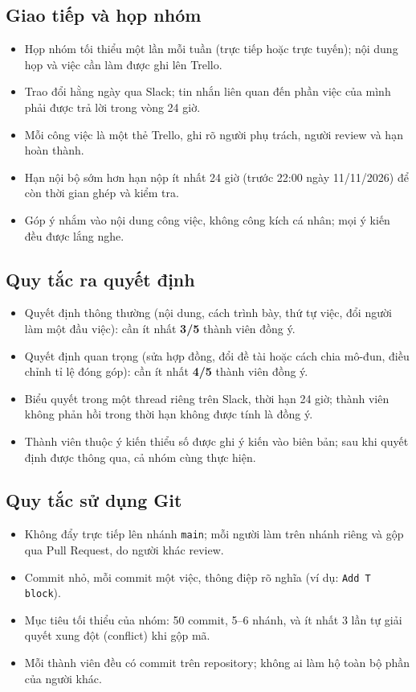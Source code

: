 \documentclass[13pt,a4paper]{extarticle}
\begin{document}
\subsection{Giao tiếp và họp nhóm}
\begin{itemize}
  \item Họp nhóm tối thiểu một lần mỗi tuần (trực tiếp hoặc trực tuyến); nội dung họp và việc cần làm được ghi lên Trello.
  \item Trao đổi hằng ngày qua Slack; tin nhắn liên quan đến phần việc của mình phải được trả lời trong vòng 24 giờ.
  \item Mỗi công việc là một thẻ Trello, ghi rõ người phụ trách, người review và hạn hoàn thành.
  \item Hạn nội bộ sớm hơn hạn nộp ít nhất 24 giờ (trước 22:00 ngày 11/11/2026) để còn thời gian ghép và kiểm tra.
  \item Góp ý nhắm vào nội dung công việc, không công kích cá nhân; mọi ý kiến đều được lắng nghe.
\end{itemize}

\subsection{Quy tắc ra quyết định}
\begin{itemize}
  \item Quyết định thông thường (nội dung, cách trình bày, thứ tự việc, đổi người làm một đầu việc): cần ít nhất \textbf{3/5} thành viên đồng ý.
  \item Quyết định quan trọng (sửa hợp đồng, đổi đề tài hoặc cách chia mô-đun, điều chỉnh tỉ lệ đóng góp): cần ít nhất \textbf{4/5} thành viên đồng ý.
  \item Biểu quyết trong một thread riêng trên Slack, thời hạn 24 giờ; thành viên không phản hồi trong thời hạn không được tính là đồng ý.
  \item Thành viên thuộc ý kiến thiểu số được ghi ý kiến vào biên bản; sau khi quyết định được thông qua, cả nhóm cùng thực hiện.
\end{itemize}

\subsection{Quy tắc sử dụng Git}
\begin{itemize}
  \item Không đẩy trực tiếp lên nhánh \texttt{main}; mỗi người làm trên nhánh riêng và gộp qua Pull Request, do người khác review.
  \item Commit nhỏ, mỗi commit một việc, thông điệp rõ nghĩa (ví dụ: \texttt{Add T block}).
  \item Mục tiêu tối thiểu của nhóm: 50 commit, 5--6 nhánh, và ít nhất 3 lần tự giải quyết xung đột (conflict) khi gộp mã.
  \item Mỗi thành viên đều có commit trên repository; không ai làm hộ toàn bộ phần của người khác.
\end{itemize}
\end{document}
